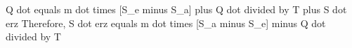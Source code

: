Q dot equals m dot times [S_e minus S_a] plus Q dot divided by T plus S dot erz  
Therefore, S dot erz equals m dot times [S_a minus S_e] minus Q dot divided by T